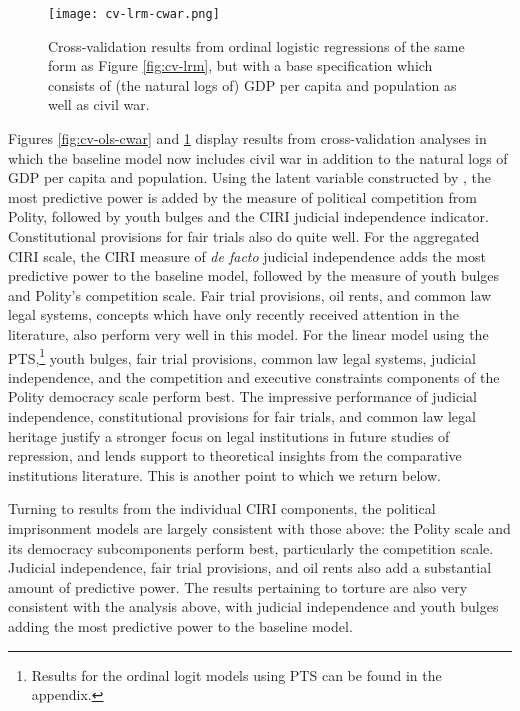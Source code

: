 \documentclass[12pt]{article}
\begin{document}
\begin{figure}[!htpb]
\centering
\texttt{[image: cv-lrm-cwar.png]}
\caption{Cross-validation results from ordinal logistic regressions of the same form as Figure \ref{fig:cv-lrm}, but with a base specification which consists of (the natural logs of) GDP per capita and population as well as civil war.}
\label{fig:cv-lrm-cwar}
\end{figure}

Figures \ref{fig:cv-ols-cwar} and \ref{fig:cv-lrm-cwar} display results from cross-validation analyses in which the baseline model now includes civil war in addition to the natural logs of GDP per 
capita and population. Using the latent variable constructed by \citet{Fariss2013}, the most predictive power is added by the measure of political competition from Polity, followed by youth bulges and the CIRI judicial independence indicator. Constitutional provisions for fair trials also do quite well. For the aggregated CIRI scale, the CIRI measure of {\it de facto} judicial independence adds the most predictive power to the baseline model, followed by the measure of youth bulges and Polity's competition scale. Fair trial provisions, oil rents, and common law legal systems, concepts which have only recently received attention in the literature, also perform very well in this model. For the linear model using the PTS,\footnote{Results for the ordinal logit models using PTS can be found in the appendix.} youth bulges, fair trial provisions, common law legal systems, judicial independence, and the competition and executive constraints components of the Polity democracy scale perform best. The impressive performance of  judicial independence, constitutional provisions for fair trials, and common law legal heritage justify a stronger focus on legal institutions in future studies of repression, and lends support to theoretical insights from the comparative institutions literature. This is another point to which we return below.

Turning to results from the individual CIRI components, the political imprisonment models are largely consistent with those above: the Polity scale and its democracy subcomponents perform best, particularly the competition scale. Judicial independence, fair trial provisions, and oil rents also add a substantial amount of predictive power. The results pertaining to torture are also very consistent with the analysis above, with judicial independence and youth bulges adding the most predictive power to the baseline model. 
\end{document}
